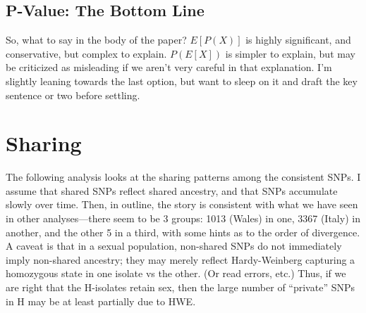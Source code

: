 \documentclass{article}\usepackage[]{graphicx}\usepackage[]{color}
\begin{document}

\subsection{P-Value: The Bottom Line}
So, what to say in the body of the paper?  
$E[P(X)]$ is highly significant, and conservative, but complex to explain.  $P(E[X])$ is simpler to explain, but may be criticized as misleading if we aren't very careful in that explanation.  I'm slightly leaning towards the last option, but want to sleep on it and draft the key sentence or two before settling.

\section{Sharing}
The following analysis looks at the sharing patterns among the consistent SNPs.  I assume that shared SNPs reflect
shared ancestry, and that SNPs accumulate slowly over time.  Then, in outline, the story is consistent with what we have
seen in other analyses---there seem to be 3 groups: 1013 (Wales) in one, 3367 (Italy) in another, and the other 5 in a
third, with some hints as to the order of divergence.  A caveat is that in a sexual population, non-shared SNPs do not
immediately imply non-shared ancestry; they may merely reflect Hardy-Weinberg capturing a homozygous 
state in one isolate vs the other.  (Or read errors, etc.)  Thus, if we are right that the H-isolates retain sex, 
then the large number of ``private'' SNPs in H may be at least partially due to HWE.
\end{document}
